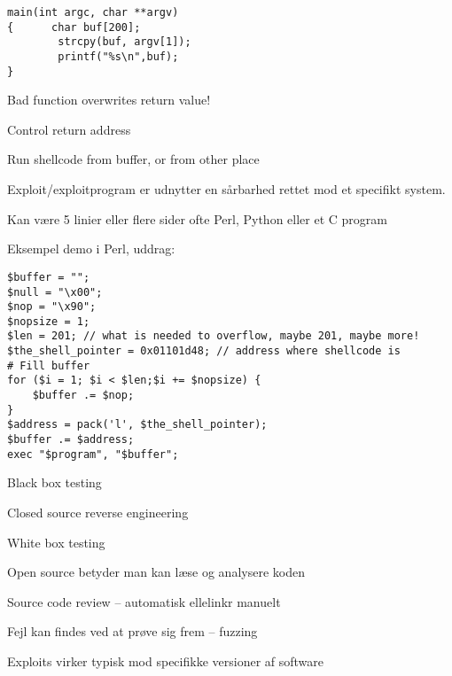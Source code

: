\documentclass[Screen16to9,17pt]{foils}
\begin{document}


\begin{verbatim}
main(int argc, char **argv)
{      char buf[200];
        strcpy(buf, argv[1]);
        printf("%s\n",buf);
}
\end{verbatim}




\begin{list2}
\item Bad function overwrites return value!
\item Control return address
\item Run shellcode from buffer, or from other place
\end{list2}



\begin{list2}
\item Exploit/exploitprogram er udnytter en sårbarhed rettet mod et specifikt system.
\item Kan være 5 linier eller flere sider ofte Perl, Python eller et C program
\end{list2}

Eksempel demo i Perl, uddrag:
\begin{verbatim}
$buffer = "";
$null = "\x00";
$nop = "\x90";
$nopsize = 1;
$len = 201; // what is needed to overflow, maybe 201, maybe more!
$the_shell_pointer = 0x01101d48; // address where shellcode is
# Fill buffer
for ($i = 1; $i < $len;$i += $nopsize) {
    $buffer .= $nop;
}
$address = pack('l', $the_shell_pointer);
$buffer .= $address;
exec "$program", "$buffer";
\end{verbatim}



\begin{list1}
\item Black box testing
\item Closed source reverse engineering
\item White box testing
\item Open source betyder man kan læse og analysere koden
\item Source code review -- automatisk ellelinkr manuelt
\item Fejl kan findes ved at prøve sig frem -- fuzzing
\item Exploits virker typisk mod specifikke versioner af software
\end{list1}
\end{document}
